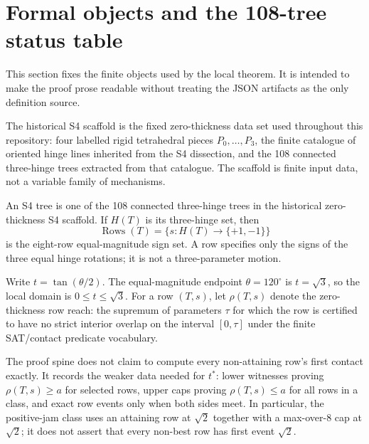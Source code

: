 
\section{Formal objects and the 108-tree status table}

This section fixes the finite objects used by the local theorem.  It is intended to make the proof prose readable without treating the JSON artifacts as the only definition source.

\begin{definition}
The historical S4 scaffold is the fixed zero-thickness data set used throughout this repository: four labelled rigid tetrahedral pieces \(P_0,\ldots,P_3\), the finite catalogue of oriented hinge lines inherited from the S4 dissection, and the 108 connected three-hinge trees extracted from that catalogue.  The scaffold is finite input data, not a variable family of mechanisms.
\end{definition}

\begin{definition}
An S4 tree is one of the 108 connected three-hinge trees in the historical zero-thickness S4 scaffold.  If \(H(T)\) is its three-hinge set, then
\[
  \operatorname{Rows}(T)=\{s:H(T)\to\{+1,-1\}\}
\]
is the eight-row equal-magnitude sign set.  A row specifies only the signs of the three equal hinge rotations; it is not a three-parameter motion.
\end{definition}

\begin{definition}
Write \(t=\tan(\theta/2)\).  The equal-magnitude endpoint \(\theta=120^\circ\) is \(t=\sqrt{3}\), so the local domain is \(0\le t\le\sqrt{3}\).  For a row \((T,s)\), let \(\rho(T,s)\) denote the zero-thickness row reach: the supremum of parameters \(\tau\) for which the row is certified to have no strict interior overlap on the interval \([0,\tau]\) under the finite SAT/contact predicate vocabulary.

The proof spine does not claim to compute every non-attaining row's first contact exactly.  It records the weaker data needed for \(t^*\): lower witnesses proving \(\rho(T,s)\ge a\) for selected rows, upper caps proving \(\rho(T,s)\le a\) for all rows in a class, and exact row events only when both sides meet.  In particular, the positive-jam class uses an attaining row at \(\sqrt{2}\) together with a max-over-8 cap at \(\sqrt{2}\); it does not assert that every non-best row has first event \(\sqrt{2}\).
\end{definition}

